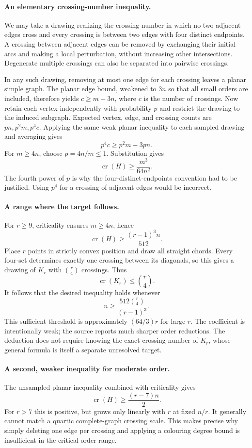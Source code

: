 \documentclass[11pt,a4paper]{article}
\begin{document}
\paragraph{An elementary crossing-number inequality.}
We may take a drawing realizing the crossing number in which no two adjacent edges cross and every crossing is between two edges with four distinct endpoints. A crossing between adjacent edges can be removed by exchanging their initial arcs and making a local perturbation, without increasing other intersections. Degenerate multiple crossings can also be separated into pairwise crossings.

In any such drawing, removing at most one edge for each crossing leaves a planar simple graph. The planar edge bound, weakened to $3n$ so that all small orders are included, therefore yields $c\ge m-3n$, where $c$ is the number of crossings. Now retain each vertex independently with probability $p$ and restrict the drawing to the induced subgraph. Expected vertex, edge, and crossing counts are $pn,p^2m,p^4c$. Applying the same weak planar inequality to each sampled drawing and averaging gives
\[
p^4c\ge p^2m-3pn.
\]
For $m\ge4n$, choose $p=4n/m\le1$. Substitution gives
\[
\operatorname{cr}(H)\ge\frac{m^3}{64n^2}.
\]
The fourth power of $p$ is why the four-distinct-endpoints convention had to be justified. Using $p^4$ for a crossing of adjacent edges would be incorrect.

\paragraph{A range where the target follows.}
For $r\ge9$, criticality ensures $m\ge4n$, hence
\[
\operatorname{cr}(H)\ge\frac{(r-1)^3n}{512}.
\]
Place $r$ points in strictly convex position and draw all straight chords. Every four-set determines exactly one crossing between its diagonals, so this gives a drawing of $K_r$ with $\binom r4$ crossings. Thus
\[
\operatorname{cr}(K_r)\le\binom r4.
\]
It follows that the desired inequality holds whenever
\[
n\ge\frac{512\binom r4}{(r-1)^3}.
\]
This sufficient threshold is approximately $(64/3)r$ for large $r$. The coefficient is intentionally weak; the source reports much sharper order reductions. The deduction does not require knowing the exact crossing number of $K_r$, whose general formula is itself a separate unresolved target.

\paragraph{A second, weaker inequality for moderate order.}
The unsampled planar inequality combined with criticality gives
\[
\operatorname{cr}(H)\ge \frac{(r-7)n}{2}.
\]
For $r>7$ this is positive, but grows only linearly with $r$ at fixed $n/r$. It generally cannot match a quartic complete-graph crossing scale. This makes precise why simply deleting one edge per crossing and applying a colouring degree bound is insufficient in the critical order range.
\end{document}

